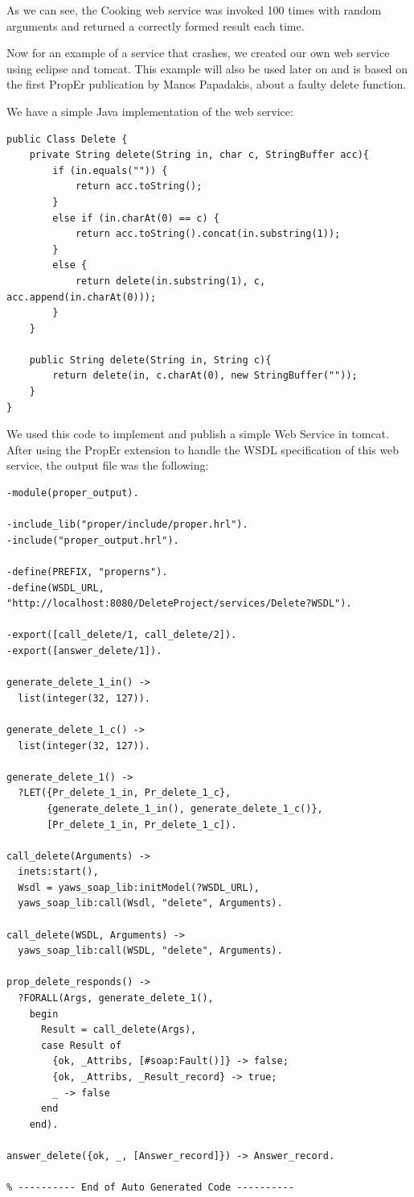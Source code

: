 \documentclass[submission,copyright,a4]{eptcs}
\begin{document}
As we can see, the Cooking web service was invoked 100 times with random arguments and returned a correctly formed result each time.

Now for an example of a service that crashes, we created our own web service using eclipse and tomcat. This example will also be used later on and is based on the first PropEr publication by Manos Papadakis, about a faulty delete function.

We have a simple Java implementation of the web service:

\begin{lstlisting}
public Class Delete {
    private String delete(String in, char c, StringBuffer acc){
        if (in.equals("")) {
            return acc.toString();
        }
        else if (in.charAt(0) == c) {
            return acc.toString().concat(in.substring(1));
        }
        else {
            return delete(in.substring(1), c, acc.append(in.charAt(0)));
        }
    }
    
    public String delete(String in, String c){
        return delete(in, c.charAt(0), new StringBuffer(""));
    } 
}
\end{lstlisting}

We used this code to implement and publish a simple Web Service in tomcat. After using the PropEr extension to handle the WSDL specification of this web service, the output file was the following:

\begin{lstlisting}
-module(proper_output).

-include_lib("proper/include/proper.hrl").
-include("proper_output.hrl").

-define(PREFIX, "properns").
-define(WSDL_URL, "http://localhost:8080/DeleteProject/services/Delete?WSDL").

-export([call_delete/1, call_delete/2]).
-export([answer_delete/1]).

generate_delete_1_in() -> 
  list(integer(32, 127)).

generate_delete_1_c() -> 
  list(integer(32, 127)).

generate_delete_1() -> 
  ?LET({Pr_delete_1_in, Pr_delete_1_c},
       {generate_delete_1_in(), generate_delete_1_c()},
       [Pr_delete_1_in, Pr_delete_1_c]).

call_delete(Arguments) ->
  inets:start(),
  Wsdl = yaws_soap_lib:initModel(?WSDL_URL),
  yaws_soap_lib:call(Wsdl, "delete", Arguments).
    
call_delete(WSDL, Arguments) ->
  yaws_soap_lib:call(WSDL, "delete", Arguments).

prop_delete_responds() ->
  ?FORALL(Args, generate_delete_1(),
    begin
      Result = call_delete(Args),
      case Result of 
        {ok, _Attribs, [#soap:Fault()]} -> false; 
        {ok, _Attribs, _Result_record} -> true;
        _ -> false
      end
    end).

answer_delete({ok, _, [Answer_record]}) -> Answer_record.

% ---------- End of Auto Generated Code ---------- 
\end{lstlisting}
\end{document}
